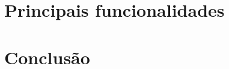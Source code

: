 \documentclass{acm_proc_article-sp}
\begin{document}
\section{Principais funcionalidades}

\section{Conclusão}~\cite{roesler_iva}

%

%
%
\balancecolumns
\end{document}
